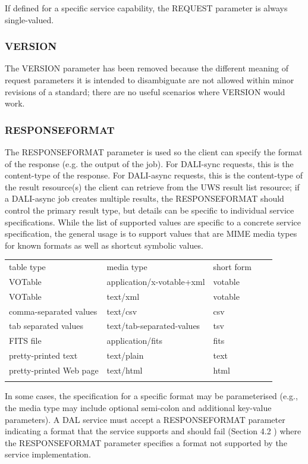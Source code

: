 \documentclass[11pt,letter]{ivoa}
\begin{document}
If defined for a specific service capability, the REQUEST parameter is always
single-valued.

\subsubsection{VERSION}
\label{sec:VERSION}
The VERSION parameter has been removed because the different
meaning of request
parameters it is intended to disambiguate are not allowed within minor
revisions of a standard; there are no useful scenarios where VERSION would work.

\subsubsection{RESPONSEFORMAT}
\label{sec:RESPONSEFORMAT}
The RESPONSEFORMAT parameter is used so the client can specify the format of the
response (e.g. the output of the job). For DALI-sync requests, this is the
content-type of the response. For DALI-async requests, this is the content-type
of the result resource(s) the client can retrieve from the UWS result list
resource; if a DALI-async job creates multiple results, the RESPONSEFORMAT
should control the primary result type, but details can be specific to
individual service specifications. While the list of supported values are
specific to a concrete service specification, the general usage is to support
values that are MIME media types \citep{std:MIME} for known
formats as well as
shortcut symbolic values.

\begin{tabular}{l l l l l}
\sptablerule
table type & media type & short form \\
\sptablerule
VOTable & application/x-votable+xml & votable & \\
VOTable & text/xml & votable & \\
comma-separated values & text/csv & csv & \\
tab separated values & text/tab-separated-values & tsv & \\
FITS file & application/fits & fits & \\
pretty-printed text & text/plain & text & \\
pretty-printed Web page & text/html & html & \\
\sptablerule
\label{tab:mimetypes}
\end{tabular}

In some cases, the specification for a specific format may be parameterised
(e.g., the media type may include optional semi-colon and additional key-value
parameters). A DAL service must accept a RESPONSEFORMAT parameter indicating a
format that the service supports and should  fail (Section 4.2 ) where the
RESPONSEFORMAT parameter specifies a format not supported by the service
implementation.
\end{document}
